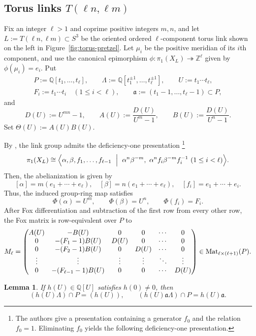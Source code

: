 \documentclass{article}
\theoremstyle{definition}
\theoremstyle{plain}
\newtheorem{lemma}[definition]{Lemma}
\newcommand{\Q}{{\mathbb{Q}}}
\newcommand{\Mat}{{\rm Mat}}
\newcommand{\Z}{\mathbb{Z}}
\begin{document}
\subsection{Torus links $T(\ell n,\ell m)$}\label{subsec:torus-links}

Fix an integer \(\ell>1\) and coprime positive integers \(m,n\), and let
\(L:=T(\ell n,\ell m)\subset S^3\) be the oriented ordered
\(\ell\)-component torus link shown on the left in
Figure~\ref{fig:torus-pretzel}.  Let \(\mu_i\) be the positive meridian of
its \(i\)th component, and use the canonical epimorphism
\(\phi\colon\pi_1(X_L)\twoheadrightarrow\Z^\ell\) given by
\(\phi(\mu_i)=e_i\).  Put
\[
\begin{gathered}
 P:=\Q[t_1,\dots,t_\ell],\qquad
 \Lambda:=\Q[t_1^{\pm1},\dots,t_\ell^{\pm1}],\qquad
 U:=t_1\cdots t_\ell,\\
 F_i:=t_1\cdots t_i\quad(1\le i<\ell),\qquad
 \mathfrak a:=(t_1-1,\dots,t_\ell-1)\subset P,
\end{gathered}
\]
and
\[
 D(U):=U^{mn}-1,\qquad
 A(U):=\frac{D(U)}{U^m-1},\qquad
 B(U):=\frac{D(U)}{U^n-1}.
\]
Set \(\Theta(U):=A(U)B(U)\).

By \cite{AK}, the link group admits the deficiency-one presentation
\footnote{The authors \cite{AK} give a presentation containing a generator \(f_0\)
and the relation \(f_0=1\). Eliminating \(f_0\) yields the following
deficiency-one presentation.}
\[
 \pi_1(X_L)\cong
 \Bigl\langle \alpha,\beta,f_1,\dots,f_{\ell-1}
 \ \Bigm|\
 \alpha^n\beta^{-m},\
 \alpha^n f_i \beta^{-m} f_i^{-1}\ (1\le i<\ell)
 \Bigr\rangle.
\]
Then, the abelianization is given by
 \[ [\alpha]=m(e_1+ \cdots +e_{\ell}), \quad 
[\beta]=n(e_1+ \cdots +e_{\ell}), \quad 
[f_i]= e_1+ \cdots +e_{i}.
\]
Thus, the induced group-ring map satisfies
\[
\Phi(\alpha)=U^m,\qquad \Phi(\beta)=U^n,\qquad \Phi(f_i)=F_i.
\]
After Fox differentiation and subtraction of the first row from every
other row, the Fox matrix is row-equivalent over \(P\) to
\[
 M_\ell=
 \begin{pmatrix}
 A(U) & -B(U) & 0 & 0 & \cdots & 0\\
 0 & -(F_1-1)B(U) & D(U) & 0 & \cdots & 0\\
 0 & -(F_2-1)B(U) & 0 & D(U) & \cdots & 0\\
 \vdots & \vdots & \vdots & \vdots & \ddots & \vdots\\
 0 & -(F_{\ell-1}-1)B(U) & 0 & 0 & \cdots & D(U)
 \end{pmatrix}
 \in\Mat_{\ell\times(\ell+1)}(P).
\]

\begin{lemma}\label{lem:toruslink-saturation}
If \(h(U)\in\Q[U]\) satisfies \(h(0)\ne0\), then
\[
 (h(U)\Lambda)\cap P=(h(U)),\qquad
 (h(U)\mathfrak a\Lambda)\cap P=h(U)\mathfrak a.
\]
\end{lemma}
\end{document}
